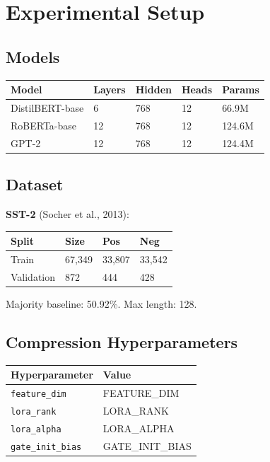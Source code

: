 \section{Experimental Setup}

\subsection{Models}

\begin{table}[H]
\centering
\small
\begin{tabular}{lllll}
\toprule
\textbf{Model} & \textbf{Layers} & \textbf{Hidden} & \textbf{Heads} & \textbf{Params} \\
\midrule
DistilBERT-base & 6 & 768 & 12 & 66.9M \\
RoBERTa-base & 12 & 768 & 12 & 124.6M \\
GPT-2 & 12 & 768 & 12 & 124.4M \\
\bottomrule
\end{tabular}
\end{table}

\subsection{Dataset}

\textbf{SST-2} (Socher et al., 2013):

\begin{table}[H]
\centering
\small
\begin{tabular}{llll}
\toprule
\textbf{Split} & \textbf{Size} & \textbf{Pos} & \textbf{Neg} \\
\midrule
Train & 67,349 & 33,807 & 33,542 \\
Validation & 872 & 444 & 428 \\
\bottomrule
\end{tabular}
\end{table}

Majority baseline: 50.92\%. Max length: 128.

\subsection{Compression Hyperparameters}

\begin{table}[H]
\centering
\small
\begin{tabular}{ll}
\toprule
\textbf{Hyperparameter} & \textbf{Value} \\
\midrule
\texttt{feature\_dim} & {{FEATURE\_DIM}} \\
\texttt{lora\_rank} & {{LORA\_RANK}} \\
\texttt{lora\_alpha} & {{LORA\_ALPHA}} \\
\texttt{gate\_init\_bias} & {{GATE\_INIT\_BIAS}} \\
\bottomrule
\end{tabular}
\end{table}

